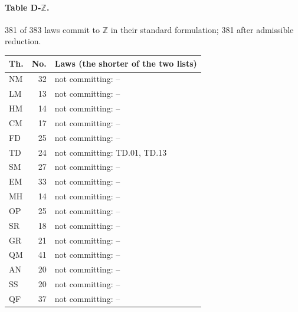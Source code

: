 \paragraph{Table D-$\mathbb Z$.} 381 of 383 laws commit to $\mathbb Z$ in their standard formulation; 381 after admissible reduction.
{\scriptsize\setlength{\tabcolsep}{3pt}
\begin{longtable}{l r p{12.2cm}}
\toprule
Th. & No. & Laws (the shorter of the two lists) \\
\midrule
\endhead
\bottomrule\endfoot
NM & 32 & not committing: -- \\
LM & 13 & not committing: -- \\
HM & 14 & not committing: -- \\
CM & 17 & not committing: -- \\
FD & 25 & not committing: -- \\
TD & 24 & not committing: TD.01, TD.13 \\
SM & 27 & not committing: -- \\
EM & 33 & not committing: -- \\
MH & 14 & not committing: -- \\
OP & 25 & not committing: -- \\
SR & 18 & not committing: -- \\
GR & 21 & not committing: -- \\
QM & 41 & not committing: -- \\
AN & 20 & not committing: -- \\
SS & 20 & not committing: -- \\
QF & 37 & not committing: -- \\
\end{longtable}
}
